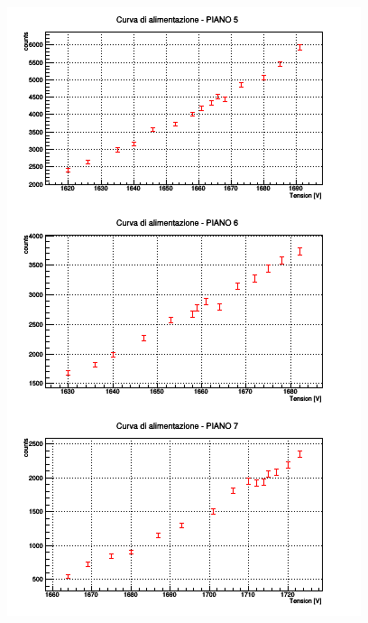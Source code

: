 \documentclass[11pt]{article}
\begin{document}
\begin{figure}
\includegraphics{"plateau_2"}
\end{figure}
\end{document}
